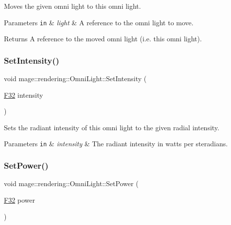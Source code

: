 Moves the given omni light to this omni light.


\begin{DoxyParams}[1]{Parameters}
\mbox{\tt in}  & {\em light} & A reference to the omni light to move. \\
\hline
\end{DoxyParams}
\begin{DoxyReturn}{Returns}
A reference to the moved omni light (i.\+e. this omni light). 
\end{DoxyReturn}
\hypertarget{classmage_1_1rendering_1_1_omni_light_aa2a936678bde1f957fd70207d2460d06}{}\label{classmage_1_1rendering_1_1_omni_light_aa2a936678bde1f957fd70207d2460d06} 
\subsubsection{\texorpdfstring{Set\+Intensity()}{SetIntensity()}}
{\footnotesize\ttfamily void mage\+::rendering\+::\+Omni\+Light\+::\+Set\+Intensity (\begin{DoxyParamCaption}\item[{\hyperlink{namespacemage_aa97e833b45f06d60a0a9c4fc22ae02c0}{F32}}]{intensity }\end{DoxyParamCaption})\hspace{0.3cm}{\ttfamily [noexcept]}}

Sets the radiant intensity of this omni light to the given radial intensity.


\begin{DoxyParams}[1]{Parameters}
\mbox{\tt in}  & {\em intensity} & The radiant intensity in watts per steradians. \\
\hline
\end{DoxyParams}
\hypertarget{classmage_1_1rendering_1_1_omni_light_a1887bf9c7f732188814b34f686638443}{}\label{classmage_1_1rendering_1_1_omni_light_a1887bf9c7f732188814b34f686638443} 
\subsubsection{\texorpdfstring{Set\+Power()}{SetPower()}}
{\footnotesize\ttfamily void mage\+::rendering\+::\+Omni\+Light\+::\+Set\+Power (\begin{DoxyParamCaption}\item[{\hyperlink{namespacemage_aa97e833b45f06d60a0a9c4fc22ae02c0}{F32}}]{power }\end{DoxyParamCaption})\hspace{0.3cm}{\ttfamily [noexcept]}}

